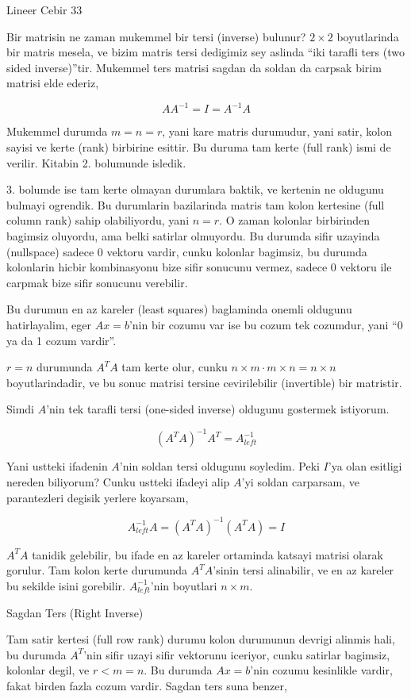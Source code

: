 \documentclass[12pt,fleqn]{article}\usepackage{../common}
\begin{document}
Lineer Cebir 33

Bir matrisin ne zaman mukemmel bir tersi (inverse) bulunur? $2 \times 2$
boyutlarinda bir matris mesela, ve bizim matris tersi dedigimiz sey aslinda
``iki tarafli ters (two sided inverse)''tir. Mukemmel ters matrisi sagdan
da soldan da carpsak birim matrisi elde ederiz,

$$ A A^{-1} = I = A^{-1}A $$

Mukemmel durumda $m = n = r$, yani kare matris durumudur, yani satir, kolon
sayisi ve kerte (rank) birbirine esittir. Bu duruma tam kerte (full rank)
ismi de verilir. Kitabin 2. bolumunde isledik.

3. bolumde ise tam kerte olmayan durumlara baktik, ve kertenin ne oldugunu
bulmayi ogrendik. Bu durumlarin bazilarinda matris tam kolon kertesine
(full column rank) sahip olabiliyordu, yani $n = r$. O zaman kolonlar
birbirinden bagimsiz oluyordu, ama belki satirlar olmuyordu. Bu durumda
sifir uzayinda (nullspace) sadece 0 vektoru vardir, cunku kolonlar
bagimsiz, bu durumda kolonlarin hicbir kombinasyonu bize sifir sonucunu
vermez, sadece 0 vektoru ile carpmak bize sifir sonucunu verebilir.

Bu durumun en az kareler (least squares) baglaminda onemli oldugunu
hatirlayalim, eger $Ax = b$'nin bir cozumu var ise bu cozum tek cozumdur,
yani ``0 ya da 1 cozum vardir''.

$r=n$ durumunda $A^TA$ tam kerte olur, cunku $n \times m \cdot m \times
n = n \times n$ 
boyutlarindadir, ve bu sonuc matrisi tersine cevirilebilir
(invertible) bir matristir.

Simdi $A$'nin tek tarafli tersi (one-sided inverse) oldugunu gostermek
istiyorum.

$$ (A^TA)^{-1} A^T = A_{left}^{-1} $$

Yani ustteki ifadenin $A$'nin soldan tersi oldugunu soyledim. Peki $I$'ya
olan esitligi nereden biliyorum? Cunku ustteki ifadeyi alip $A$'yi soldan
carparsam, ve parantezleri degisik yerlere koyarsam,

$$  A_{left}^{-1} A  = (A^TA)^{-1} (A^TA) = I$$

$A^TA$ tanidik gelebilir, bu ifade en az kareler ortaminda katsayi matrisi
olarak gorulur. Tam kolon kerte durumunda $A^TA$'sinin tersi alinabilir, ve
en az kareler bu sekilde isini gorebilir.  $A_{left}^{-1}$'nin boyutlari $n
\times m$.

Sagdan Ters (Right Inverse)

Tam satir kertesi (full row rank) durumu kolon durumunun devrigi alinmis
hali, bu durumda $A^T$'nin sifir uzayi sifir vektorunu iceriyor, cunku
satirlar bagimsiz, kolonlar degil, ve $r < m = n$. Bu durumda $Ax = b$'nin
cozumu kesinlikle vardir, fakat birden fazla cozum vardir. Sagdan ters suna
benzer, 
\end{document}
